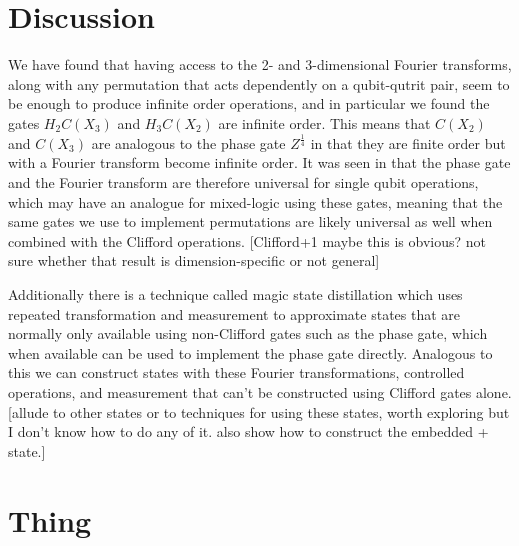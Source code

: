 \documentclass[]{article}
\begin{document}
\section{Discussion}
We have found that having access to the 2- and 3-dimensional Fourier transforms, along with any permutation that acts dependently on a qubit-qutrit pair, seem to be enough to produce infinite order operations, and in particular we found the gates $H_2 C(X_3)$ and $H_3 C(X_2)$ are infinite order. This means that $C(X_2)$ and $C(X_3)$ are analogous to the phase gate $Z^{\frac{1}{4}}$ in that they are finite order but with a Fourier transform become infinite order. It was seen in \cite{universal-qubit} that the phase gate and the Fourier transform are therefore universal for single qubit operations, which may have an analogue for mixed-logic using these gates, meaning that the same gates we use to implement permutations are likely universal as well when combined with the Clifford operations. [Clifford+1 maybe this is obvious? not sure whether that result is dimension-specific or not general]

Additionally there is a technique called magic state distillation which uses repeated transformation and measurement to approximate states that are normally only available using non-Clifford gates such as the phase gate, which when available can be used to implement the phase gate directly. Analogous to this we can construct states with these Fourier transformations, controlled operations, and measurement that can't be constructed using Clifford gates alone. [allude to other states or to techniques for using these states, worth exploring but I don't know how to do any of it. also show how to construct the embedded + state.]

\section{Thing}
\end{document}
